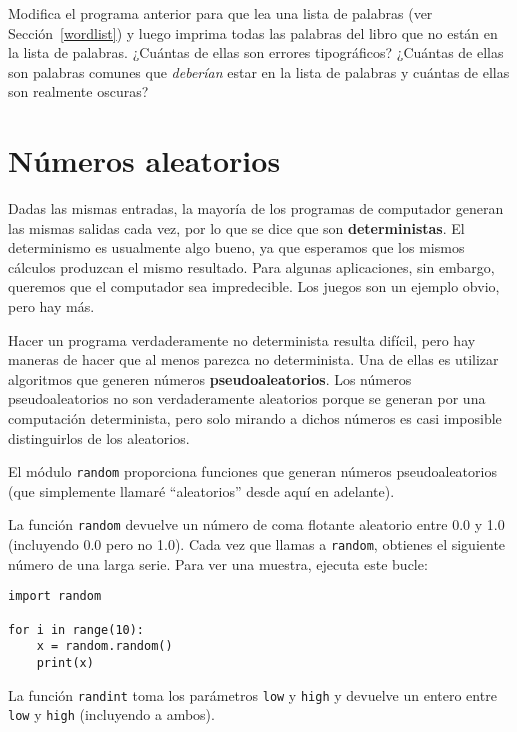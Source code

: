 \documentclass[10pt]{book}
\begin{document}
\begin{exercise}

Modifica el programa anterior para que lea una lista de palabras (ver
Sección~\ref{wordlist}) y luego imprima todas las palabras del libro que
no están en la lista de palabras.  ¿Cuántas de ellas son errores tipográficos?
¿Cuántas de ellas son palabras comunes que {\em deberían} estar en la lista
de palabras y cuántas de ellas son realmente oscuras?

\end{exercise}


\section{Números aleatorios}

Dadas las mismas entradas, la mayoría de los programas de computador generan
las mismas salidas cada vez, por lo que se dice que son {\bf deterministas}.
El determinismo es usualmente algo bueno, ya que esperamos que los mismos
cálculos produzcan el mismo resultado.  Para algunas aplicaciones, sin embargo,
queremos que el computador sea impredecible.  Los juegos son un ejemplo
obvio, pero hay más.

Hacer un programa verdaderamente no determinista resulta difícil,
pero hay maneras de hacer que al menos parezca no determinista.  Una de
ellas es utilizar algoritmos que generen números {\bf pseudoaleatorios}.
Los números pseudoaleatorios no son verdaderamente aleatorios porque se generan
por una computación determinista, pero solo mirando a dichos números
es casi imposible distinguirlos de los aleatorios.

El módulo {\tt random} proporciona funciones que generan
números pseudoaleatorios (que simplemente llamaré ``aleatorios'' desde
aquí en adelante).

La función {\tt random} devuelve un número de coma flotante aleatorio
entre 0.0 y 1.0 (incluyendo 0.0 pero no 1.0).  Cada vez que
llamas a {\tt random}, obtienes el siguiente número de una larga serie.
Para ver una muestra, ejecuta este bucle:

\begin{verbatim}
import random

for i in range(10):
    x = random.random()
    print(x)
\end{verbatim}
%
La función {\tt randint} toma los parámetros {\tt low} y
{\tt high} y devuelve un entero entre {\tt low} y
{\tt high} (incluyendo a ambos).
\end{document}

